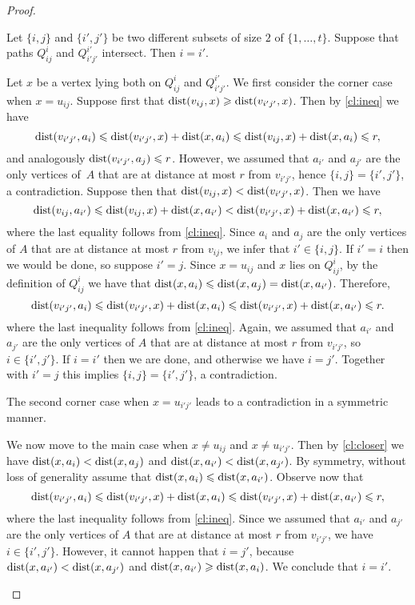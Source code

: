 \begin{proof}
\begin{claim}\label{cl:intersect}
Let $\{i,j\}$ and $\{i',j'\}$ be two different subsets of size $2$ of $\{1,\ldots,t\}$.
Suppose that paths $Q^i_{ij}$ and $Q^{i'}_{i'j'}$ intersect.
Then $i=i'$.
\end{claim}
\begin{clproof}
Let $x$ be a vertex lying both on $Q^i_{ij}$ and $Q^{i'}_{i'j'}$. We first consider the corner case when $x=u_{ij}$.
Suppose first that $\mathrm{dist}(v_{ij},x)\geqslant \mathrm{dist}(v_{i'j'},x)$. Then by \cref{cl:ineq} we have
$$\mathrm{dist}(v_{i'j'},a_i)\leqslant \mathrm{dist}(v_{i'j'},x)+\mathrm{dist}(x,a_i)\leqslant \mathrm{dist}(v_{ij},x)+\mathrm{dist}(x,a_i)\leqslant r,$$
and analogously $\mathrm{dist}(v_{i'j'},a_{j})\leqslant r$. However, we assumed that $a_{i'}$ and $a_{j'}$ are the only vertices of~$A$ that are at distance at most $r$ from $v_{i'j'}$, hence $\{i,j\}=\{i',j'\}$,
a contradiction. Suppose then that $\mathrm{dist}(v_{ij},x)<\mathrm{dist}(v_{i'j'},x)$. 
Then we have
$$\mathrm{dist}(v_{ij},a_{i'})\leqslant \mathrm{dist}(v_{ij},x)+\mathrm{dist}(x,a_{i'})<\mathrm{dist}(v_{i'j'},x)+\mathrm{dist}(x,a_{i'})\leqslant r,$$
where the last equality follows from \cref{cl:ineq}.
Since $a_i$ and $a_j$ are the only vertices of $A$ that are at distance at most $r$ from $v_{ij}$, we infer that $i'\in \{i,j\}$. 
If $i'=i$ then we would be done, so suppose $i'=j$.
Since $x=u_{ij}$ and $x$ lies on $Q^i_{ij}$, by the definition of $Q^i_{ij}$ we have that $\mathrm{dist}(x,a_i)\leqslant \mathrm{dist}(x,a_j)=\mathrm{dist}(x,a_{i'})$. Therefore,
$$\mathrm{dist}(v_{i'j'},a_i)\leqslant \mathrm{dist}(v_{i'j'},x)+\mathrm{dist}(x,a_{i})\leqslant \mathrm{dist}(v_{i'j'},x)+\mathrm{dist}(x,a_{i'})\leqslant r.$$
where the last inequality follows from \cref{cl:ineq}.
Again, we assumed that $a_{i'}$ and $a_{j'}$ are the only vertices of $A$ that are at distance at most $r$ from $v_{i'j'}$, so $i\in \{i',j'\}$. If $i=i'$ then we are done, and otherwise we have $i=j'$.
Together with $i'=j$ this implies $\{i,j\}=\{i',j'\}$, a contradiction.

The second corner case when $x=u_{i'j'}$ leads to a contradiction in a symmetric manner.

We now move to the main case when $x\neq u_{ij}$ and $x\neq u_{i'j'}$.
Then by \cref{cl:closer} we have $\mathrm{dist}(x,a_i)<\mathrm{dist}(x,a_j)$ and $\mathrm{dist}(x,a_{i'})<\mathrm{dist}(x,a_{j'})$.
By symmetry, without loss of generality assume that $\mathrm{dist}(x,a_i)\leqslant \mathrm{dist}(x,a_{i'})$.
Observe now that
$$\mathrm{dist}(v_{i'j'},a_i)\leqslant \mathrm{dist}(v_{i'j'},x)+\mathrm{dist}(x,a_{i})\leqslant \mathrm{dist}(v_{i'j'},x)+\mathrm{dist}(x,a_{i'})\leqslant r,$$
where the last inequality follows from \cref{cl:ineq}.
Since we assumed that $a_{i'}$ and $a_{j'}$ are the only vertices of $A$ that are at distance at most $r$ from $v_{i'j'}$, we have $i\in \{i',j'\}$.
However, it cannot happen that $i=j'$, because $\mathrm{dist}(x,a_{i'})<\mathrm{dist}(x,a_{j'})$ and $\mathrm{dist}(x,a_{i'})\geqslant \mathrm{dist}(x,a_{i})$. We conclude that $i=i'$.
\end{clproof}


\end{proof}
